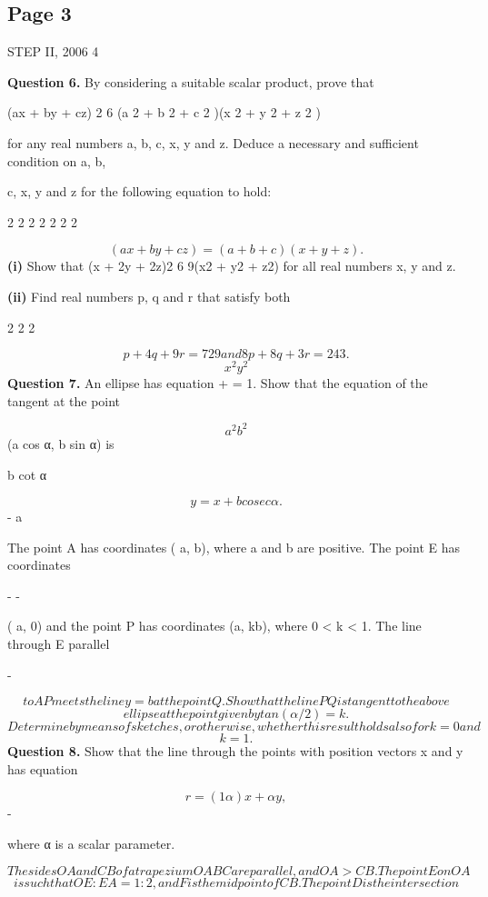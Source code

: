 \documentclass[12pt]{article}
\begin{document}
\subsection*{Page 3}
\begin{flushleft}
STEP II, 2006 4\par
\bigskip\textbf{Question 6.} By considering a suitable scalar product, prove that\par
(ax + by + cz) 2 6 (a 2 + b 2 + c 2 )(x 2 + y 2 + z 2 )\par
for any real numbers a, b, c, x, y and z. Deduce a necessary and sufficient condition on a, b,\par
c, x, y and z for the following equation to hold:\par
2 2 2 2 2 2 2\par
\[(ax + by + cz) = (a + b + c )(x + y + z ) .\]
\textbf{(i)} Show that (x + 2y + 2z)2 6 9(x2 + y2 + z2) for all real numbers x, y and z.\par
\textbf{(ii)} Find real numbers p, q and r that satisfy both\par
2 2 2\par
\[p + 4q + 9r = 729 and 8p + 8q + 3r = 243 .\]
\[x^2 y^2\]
\bigskip\textbf{Question 7.} An ellipse has equation + = 1. Show that the equation of the tangent at the point\par
\[a^2 b^2\]
(a cos α, b sin α) is\par
b cot α\par
\[y = x + b cosec α .\]
- a\par
The point A has coordinates ( a, b), where a and b are positive. The point E has coordinates\par
- -\par
( a, 0) and the point P has coordinates (a, kb), where 0 < k < 1. The line through E parallel\par
-\par
\[to AP meets the line y = b at the point Q. Show that the line P Q is tangent to the above\]
\[ellipse at the point given by tan(α/2) = k.\]
\[Determine by means of sketches, or otherwise, whether this result holds also for k = 0 and\]
\[k = 1.\]
\bigskip\textbf{Question 8.} Show that the line through the points with position vectors x and y has equation\par
\[r = (1 α)x + αy ,\]
-\par
where α is a scalar parameter.\par
\[The sides OA and CB of a trapezium OABC are parallel, and OA > CB. The point E on OA\]
\[is such that OE : EA = 1 : 2, and F is the midpoint of CB. The point D is the intersection\]

\end{flushleft}
\end{document}
